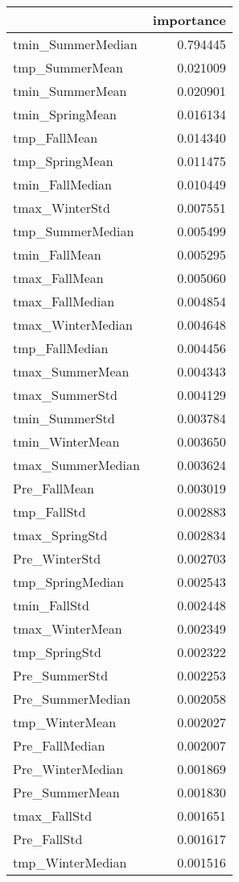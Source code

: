 \begin{tabular}{lr}
\toprule
 & importance \\
\midrule
tmin_SummerMedian & 0.794445 \\
tmp_SummerMean & 0.021009 \\
tmin_SummerMean & 0.020901 \\
tmin_SpringMean & 0.016134 \\
tmp_FallMean & 0.014340 \\
tmp_SpringMean & 0.011475 \\
tmin_FallMedian & 0.010449 \\
tmax_WinterStd & 0.007551 \\
tmp_SummerMedian & 0.005499 \\
tmin_FallMean & 0.005295 \\
tmax_FallMean & 0.005060 \\
tmax_FallMedian & 0.004854 \\
tmax_WinterMedian & 0.004648 \\
tmp_FallMedian & 0.004456 \\
tmax_SummerMean & 0.004343 \\
tmax_SummerStd & 0.004129 \\
tmin_SummerStd & 0.003784 \\
tmin_WinterMean & 0.003650 \\
tmax_SummerMedian & 0.003624 \\
Pre_FallMean & 0.003019 \\
tmp_FallStd & 0.002883 \\
tmax_SpringStd & 0.002834 \\
Pre_WinterStd & 0.002703 \\
tmp_SpringMedian & 0.002543 \\
tmin_FallStd & 0.002448 \\
tmax_WinterMean & 0.002349 \\
tmp_SpringStd & 0.002322 \\
Pre_SummerStd & 0.002253 \\
Pre_SummerMedian & 0.002058 \\
tmp_WinterMean & 0.002027 \\
Pre_FallMedian & 0.002007 \\
Pre_WinterMedian & 0.001869 \\
Pre_SummerMean & 0.001830 \\
tmax_FallStd & 0.001651 \\
Pre_FallStd & 0.001617 \\
tmp_WinterMedian & 0.001516 \\

\end{tabular}

